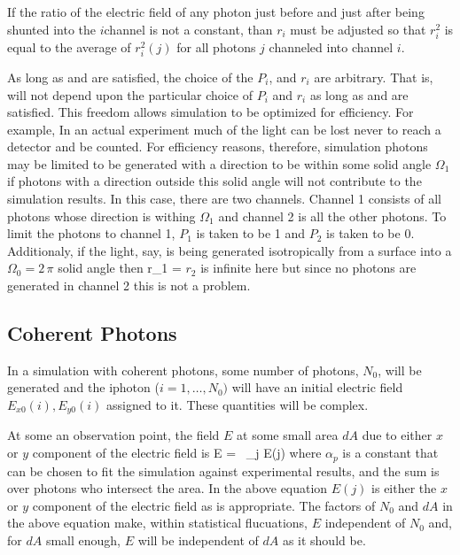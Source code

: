 If the ratio of the electric field of any photon just before and just
after being shunted into the $i$\Th channel is not a constant, than
$r_i$ must be adjusted so that $r_i^2$ is equal to the average of
$r_i^2(j)$ for all photons $j$ channeled into channel $i$.

As long as  and  are satisfied, the choice of the
$P_i$, and $r_i$ are arbitrary. That is,  will not depend
upon the particular choice of $P_i$ and $r_i$ as long as 
and  are satisfied. This freedom allows simulation to be
optimized for efficiency. For example, In an actual experiment much of
the light can be lost never to reach a detector and be counted. For
efficiency reasons, therefore, simulation photons may be limited to be
generated with a direction to be within some solid angle $\Omega_1$ if
photons with a direction outside this solid angle will not contribute
to the simulation results. In this case, there are two channels.
Channel 1 consists of all photons whose direction is withing
$\Omega_1$ and channel 2 is all the other photons. To limit the
photons to channel 1, $P_1$ is taken to be 1 and $P_2$ is taken to be
0. Additionaly, if the light, say, is being generated isotropically
from a surface into a $\Omega_0 = 2 \, \pi$ solid angle then
\Begineq
  r_1 = 
  \label{roo}
\Endeq
$r_2$ is infinite here but since no photons are generated in channel 2
this is not a problem.

\subsection{Coherent Photons}

In a simulation with coherent photons, some number of photons,
$N_0$, will be generated and the i\Th photon ($i = 1, \ldots, N_0)$
will have an initial electric field $E_{x0}(i), E_{y0}(i)$ assigned to
it. These quantities will be complex.

At some an observation point, the field $E$ at
some small area $dA$ due to either $x$ or $y$ component of the
electric field is
\Begineq
  E =  \, \sum_{j \in {}} E(j)
  \label{panda2}
\Endeq
where $\alpha_p$ is a constant that can be chosen to fit the
simulation against experimental results, and the sum is over photons
who intersect the area. In the above equation $E(j)$ is either the $x$
or $y$ component of the electric field as is appropriate. The factors
of $N_0$ and $dA$ in the above equation make, within statistical
flucuations, $E$ independent of $N_0$ and, for $dA$ small enough, $E$
will be independent of $dA$ as it should be.

